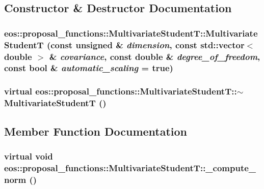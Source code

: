 \subsection{Constructor \& Destructor Documentation}
\hypertarget{classeos_1_1proposal__functions_1_1MultivariateStudentT_a491d401a59792405c093865094f23810}{
\subsubsection[{MultivariateStudentT}]{\setlength{\rightskip}{0pt plus 5cm}eos::proposal\_\-functions::MultivariateStudentT::MultivariateStudentT (const unsigned \& {\em dimension}, \/  const std::vector$<$ double $>$ \& {\em covariance}, \/  const double \& {\em degree\_\-of\_\-freedom}, \/  const bool \& {\em automatic\_\-scaling} = {\ttfamily true})}}
\label{classeos_1_1proposal__functions_1_1MultivariateStudentT_a491d401a59792405c093865094f23810}
\hypertarget{classeos_1_1proposal__functions_1_1MultivariateStudentT_acc497f43328165a02524291ed7383a89}{
\subsubsection[{$\sim$MultivariateStudentT}]{\setlength{\rightskip}{0pt plus 5cm}virtual eos::proposal\_\-functions::MultivariateStudentT::$\sim$MultivariateStudentT ()}}
\label{classeos_1_1proposal__functions_1_1MultivariateStudentT_acc497f43328165a02524291ed7383a89}


\subsection{Member Function Documentation}
\hypertarget{classeos_1_1proposal__functions_1_1MultivariateStudentT_aa44fa5958d242f5aae93c0dfa4cb8d84}{
\subsubsection[{\_\-compute\_\-norm}]{\setlength{\rightskip}{0pt plus 5cm}virtual void eos::proposal\_\-functions::MultivariateStudentT::\_\-compute\_\-norm ()}}
\label{classeos_1_1proposal__functions_1_1MultivariateStudentT_aa44fa5958d242f5aae93c0dfa4cb8d84}


